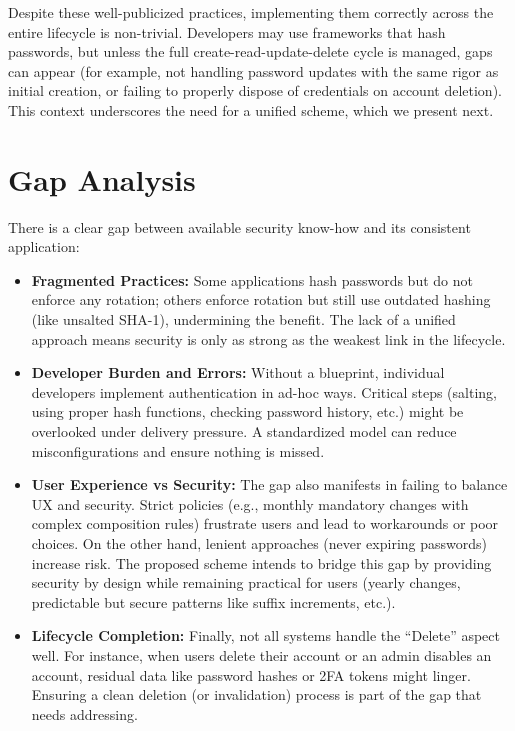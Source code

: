 \documentclass[11pt]{article}
\begin{document}
Despite these well-publicized practices, implementing them correctly across the entire lifecycle is non-trivial. Developers may use frameworks that hash passwords, but unless the full create-read-update-delete cycle is managed, gaps can appear (for example, not handling password updates with the same rigor as initial creation, or failing to properly dispose of credentials on account deletion). This context underscores the need for a unified scheme, which we present next.

\section{Gap Analysis}
There is a clear gap between available security know-how and its consistent application:
\begin{itemize}
    \item \textbf{Fragmented Practices:} Some applications hash passwords but do not enforce any rotation; others enforce rotation but still use outdated hashing (like unsalted SHA-1), undermining the benefit. The lack of a unified approach means security is only as strong as the weakest link in the lifecycle.
    \item \textbf{Developer Burden and Errors:} Without a blueprint, individual developers implement authentication in ad-hoc ways. Critical steps (salting, using proper hash functions, checking password history, etc.) might be overlooked under delivery pressure. A standardized model can reduce misconfigurations and ensure nothing is missed.
    \item \textbf{User Experience vs Security:} The gap also manifests in failing to balance UX and security. Strict policies (e.g., monthly mandatory changes with complex composition rules) frustrate users and lead to workarounds or poor choices. On the other hand, lenient approaches (never expiring passwords) increase risk. The proposed scheme intends to bridge this gap by providing security by design while remaining practical for users (yearly changes, predictable but secure patterns like suffix increments, etc.).
    \item \textbf{Lifecycle Completion:} Finally, not all systems handle the “Delete” aspect well. For instance, when users delete their account or an admin disables an account, residual data like password hashes or 2FA tokens might linger. Ensuring a clean deletion (or invalidation) process is part of the gap that needs addressing.
\end{itemize}
\end{document}
